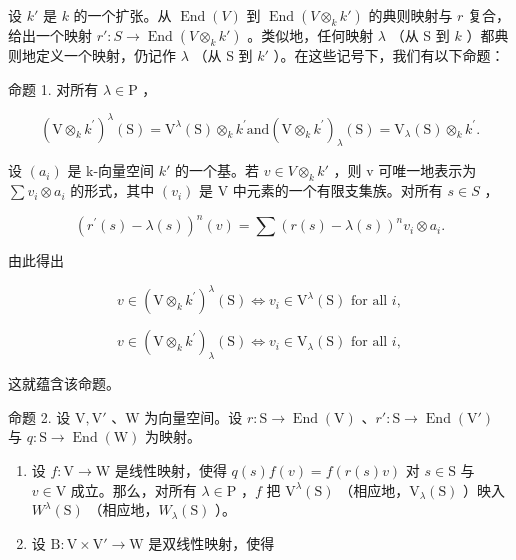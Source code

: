 设 \(k'\) 是 \(k\) 的一个扩张。从 \(\operatorname{End}(V)\) 到 \(\operatorname{End}(V \otimes_k k')\) 的典则映射与 \(r\) 复合，给出一个映射 \(r' : S \to \operatorname{End}(V \otimes_k k')\) 。类似地，任何映射 \(\lambda\) （从 S 到 \(k\) ）都典则地定义一个映射，仍记作 \(\lambda\) （从 S 到 \(k'\) ）。在这些记号下，我们有以下命题：

命题 1. 对所有 \(\lambda \in \mathrm{P}\) ，

\[
(\mathrm{V} \otimes_ {k} k ^ {\prime}) ^ {\lambda} (\mathrm{S}) = \mathrm{V} ^ {\lambda} (\mathrm{S}) \otimes_ {k} k ^ {\prime} \text {and} (\mathrm{V} \otimes_ {k} k ^ {\prime}) _ {\lambda} (\mathrm{S}) = \mathrm{V} _ {\lambda} (\mathrm{S}) \otimes_ {k} k ^ {\prime}.
\]

设 \((a_{i})\) 是 k-向量空间 \(k'\) 的一个基。若 \(v \in V \otimes_{k} k'\) ，则 v 可唯一地表示为 \(\sum v_{i} \otimes a_{i}\) 的形式，其中 \((v_{i})\) 是 V 中元素的一个有限支集族。对所有 \(s \in S\) ，

\[
(r ^ {\prime} (s) - \lambda (s)) ^ {n} (v) = \sum (r (s) - \lambda (s)) ^ {n} v _ {i} \otimes a _ {i}.
\]

由此得出

\[
v \in (\mathrm{V} \otimes_ {k} k ^ {\prime}) ^ {\lambda} (\mathrm{S}) \Longleftrightarrow v _ {i} \in \mathrm{V} ^ {\lambda} (\mathrm{S}) \text { for   all } i,
\]

\[
v \in (\mathrm{V} \otimes_ {k} k ^ {\prime}) _ {\lambda} (\mathrm{S}) \Longleftrightarrow v _ {i} \in \mathrm{V} _ {\lambda} (\mathrm{S}) \text { for   all } i,
\]

这就蕴含该命题。

命题 2. 设 \(\mathrm{V}, \mathrm{V}'\) 、\(\mathrm{W}\) 为向量空间。设 \(r: \mathrm{S} \to \operatorname{End}(\mathrm{V})\) 、\(r': \mathrm{S} \to \operatorname{End}(\mathrm{V}')\) 与 \(q: \mathrm{S} \to \operatorname{End}(\mathrm{W})\) 为映射。

\begin{enumerate}
\def\labelenumi{(\roman{enumi})}
\item
  设 \(f: \mathrm{V} \to \mathrm{W}\) 是线性映射，使得 \(q(s)f(v) = f(r(s)v)\) 对 \(s \in \mathrm{S}\) 与 \(v \in \mathrm{V}\) 成立。那么，对所有 \(\lambda \in \mathrm{P}\) ，\(f\) 把 \(\mathrm{V}^{\lambda}(\mathrm{S})\) （相应地，\(\mathrm{V}_{\lambda}(\mathrm{S})\) ）映入 \(W^{\lambda}(\mathrm{S})\) （相应地，\(W_{\lambda}(\mathrm{S})\) ）。
\item
  设 \(\mathrm{B}:\mathrm{V}\times \mathrm{V}'\to \mathrm{W}\) 是双线性映射，使得
\end{enumerate}

